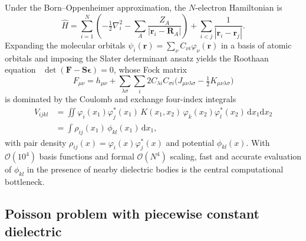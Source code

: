 \documentclass[prb,preprintnumbers,amsmath,amssymb, 10pt]{revtex4}
\newcommand{\V}[1]{\boldsymbol{#1}}
\newcommand{\abs}[1]{\left|#1\right|}
\begin{document}
Under the Born--Oppenheimer approximation, the $N$-electron Hamiltonian is
\begin{equation}
    \hat{H} = \sum_{i=1}^N \left( -\tfrac{1}{2} \nabla_{i}^2
        - \sum_{A} \frac{Z_A}{\abs{\V{r}_i - \V{R}_A}} \right)
        + \sum_{i < j} \frac{1}{|\V{r}_i - \V{r}_j|}.
\end{equation}
Expanding the molecular orbitals $\psi_i(\V{r}) = \sum_\nu C_{\nu i}
\varphi_\nu(\V{r})$ in a basis of atomic orbitals and imposing the Slater
determinant ansatz yields the Roothaan
equation~\cite{roothaan1951new,cramer2013essentials}
$\det(\V{F}-\V{S}\V{\epsilon}) = 0$, whose Fock matrix
\begin{equation}
    F_{\mu\nu} = h_{\mu\nu} + \sum_{\lambda\sigma}\sum_i 2 C_{\lambda i} C_{\sigma i}
    \bigl( J_{\mu\nu\lambda\sigma} - \tfrac{1}{2} K_{\mu\nu\lambda\sigma} \bigr)
\end{equation}
is dominated by the Coulomb and exchange four-index integrals
\begin{equation}
    \begin{split}
    V_{ijkl} &= \iint \varphi_i(x_1)\varphi_j^*(x_1)\, K(x_1,x_2)\,
        \varphi_k(x_2)\varphi_l^*(x_2)\, \mathrm{d}x_1\mathrm{d}x_2\\
    &= \int \rho_{ij}(x_1)\, \phi_{kl}(x_1)\, \mathrm{d}x_1,
    \end{split}
\end{equation}
with pair density $\rho_{ij}(x) = \varphi_i(x)\varphi_j^*(x)$ and potential
$\phi_{kl}(x)$.  With $\mathcal{O}(10^4)$ basis functions and formal
$\mathcal{O}(N^4)$ scaling, fast and accurate evaluation of $\phi_{kl}$ in the
presence of nearby dielectric bodies is the central computational bottleneck.

\subsection{Poisson problem with piecewise constant dielectric}
\end{document}
